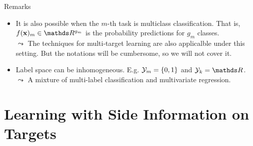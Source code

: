 \documentclass[11pt,compress,t,notes=noshow, xcolor=table]{beamer}
\begin{document}
\begin{frame}{Remarks}

		\begin{itemize}\small
            \item It is also possible when the $m$-th task is multiclass classification. That is, $f(\xv)_m \in \R^{g_m}$ is the probability predictions for $g_m$ classes. \\
            \vspace{10pt}
            $\leadsto$ The techniques for multi-target learning are also applicalble under this setting. But the notations will be cumbersome, so we will not cover it.
            \vspace{20pt}

            \item Label space can be inhomogeneous. E.g. $\mathcal{Y}_m = \{0, 1\}$ and $\Yspace_k = \R$. \\
            \vspace{10pt}
            $\leadsto$ A mixture of multi-label classification and multivariate regression.
            
		\end{itemize}


\end{frame}


\section{Learning with Side Information on Targets}
\end{document}
